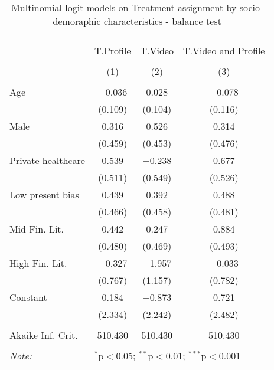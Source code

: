 
\begin{table}[H] \centering 
  \caption{Multinomial logit models on Treatment assignment by socio-demoraphic characteristics  - balance test} 
  \label{tbl:balance_lab} 
\begin{tabular}{@{\extracolsep{5pt}}lccc} 
\\[-1.8ex]\hline 
\hline \\[-1.8ex] 
\\[-1.8ex] & T.Profile & T.Video & T.Video and Profile \\ 
\\[-1.8ex] & (1) & (2) & (3)\\ 
\hline \\[-1.8ex] 
 Age & $-$0.036 & 0.028 & $-$0.078 \\ 
  & (0.109) & (0.104) & (0.116) \\ 
  Male & 0.316 & 0.526 & 0.314 \\ 
  & (0.459) & (0.453) & (0.476) \\ 
  Private healthcare & 0.539 & $-$0.238 & 0.677 \\ 
  & (0.511) & (0.549) & (0.526) \\ 
  Low present bias & 0.439 & 0.392 & 0.488 \\ 
  & (0.466) & (0.458) & (0.481) \\ 
  Mid Fin. Lit. & 0.442 & 0.247 & 0.884 \\ 
  & (0.480) & (0.469) & (0.493) \\ 
  High Fin. Lit. & $-$0.327 & $-$1.957 & $-$0.033 \\ 
  & (0.767) & (1.157) & (0.782) \\ 
  Constant & 0.184 & $-$0.873 & 0.721 \\ 
  & (2.334) & (2.242) & (2.482) \\ 
 \hline \\[-1.8ex] 
Akaike Inf. Crit. & 510.430 & 510.430 & 510.430 \\ 
\hline 
\hline \\[-1.8ex] 
\textit{Note:}  & \multicolumn{3}{l}{$^{*}$p$<$0.05; $^{**}$p$<$0.01; $^{***}$p$<$0.001} \\ 
\end{tabular} 
\end{table} 
